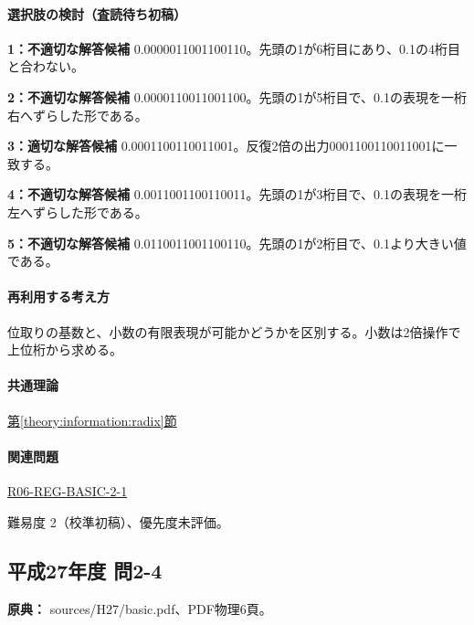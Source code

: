 \paragraph{選択肢の検討（査読待ち初稿）}\mbox{}\par

\noindent\textbf{1：不適切な解答候補} 0.0000011001100110。先頭の1が6桁目にあり、0.1の4桁目と合わない。\par

\noindent\textbf{2：不適切な解答候補} 0.0000110011001100。先頭の1が5桁目で、0.1の表現を一桁右へずらした形である。\par

\noindent\textbf{3：適切な解答候補} 0.0001100110011001。反復2倍の出力0001100110011001に一致する。\par

\noindent\textbf{4：不適切な解答候補} 0.0011001100110011。先頭の1が3桁目で、0.1の表現を一桁左へずらした形である。\par

\noindent\textbf{5：不適切な解答候補} 0.0110011001100110。先頭の1が2桁目で、0.1より大きい値である。\par

\paragraph{再利用する考え方} 位取りの基数と、小数の有限表現が可能かどうかを区別する。小数は2倍操作で上位桁から求める。

\paragraph{共通理論} \hyperref[theory:information:radix]{第\ref*{theory:information:radix}節}

\paragraph{関連問題} \hyperref[q:r06-reg-basic-2-1]{R06-REG-BASIC-2-1}

\par 難易度 2（校準初稿）、優先度未評価。

\subsection{平成27年度 問2-4}
\label{q:h27-reg-basic-2-4}

\noindent\textbf{原典：} sources/H27/basic.pdf、PDF物理6頁。

